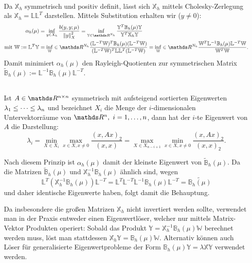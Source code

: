 \\
Da $\mathbb{X}_h$ symmetrisch und positiv definit, lässt sich $\mathbb{X}_h$ mittels Cholesky-Zerlegung als $\mathbb{X}_h = \mathbb{LL}^T$ darstellen.
Mittels Substitution erhalten wir ($y\neq 0$):
\begin{align*}
\alpha_h(\mu) &= \inf\limits_{y\in X_h} \frac{b(y,y;\mu)}{\norm{y}_X^2} =\inf\limits_{\mathbb{Y}\in \R^{N_h}}\frac{\mathbb{Y}^T\mathbb{B}_h(\mu)\mathbb{Y}}{\mathbb{Y}^T\mathbb{X}_h\mathbb{Y}}\\
\text{mit }\mathbb{W}:=\mathbb{L}^T\mathbb{Y} &= \inf\limits_{\mathbb{W}}\in \R^{N_h} \frac{(\mathbb{L}^{-T}\mathbb{W})^T\mathbb{B}_h(\mu)(\mathbb{L}^{-T}\mathbb{W})}{(\mathbb{L}^{-T}\mathbb{W})^T\mathbb{L}\mathbb{L}^T(\mathbb{L}^{-T}\mathbb{W})} = \inf\limits_{\mathbb{W}}\in \R^{N_h} \frac{\mathbb{W}^T\mathbb{L}^{-1}\mathbb{B}_h(\mu)\mathbb{L}^{-T}\mathbb{W}}{\mathbb{W}^T\mathbb{W}}.
\end{align*}
Damit minimiert $\alpha_h(\mu)$ den Rayleigh-Quotienten zur symmetrischen Matrix $\tilde{\mathbb{B}}_h(\mu) := \mathbb{L}^{-1}\mathbb{B}_h(\mu)\mathbb{L}^{-T}.$

\\
Ist $A\in \R^{n\times n}$ symmetrisch mit aufsteigend sortierten Eigenwerten $\lambda_1\le \dots \le\lambda_n$ und bezeichnet $X_i$ die Menge der $i$-dimensionalen Untervektorräume von $\R^n,~i=1\dt{,}n$, dann hat der $i$-te Eigenwert von $A$ die Darstellung:
\[
\lambda_i = \min\limits_{X\in X_i}\max\limits_{x\in X,x\neq 0} \frac{(x,Ax)_2}{(x,x)} = \max\limits_{X\in X_{n-i+1}}\min_{x\in X,x\neq 0} \frac{(x,Ax)_2}{(x,x)_2}. 
\]

Nach diesem Prinzip ist $\alpha_h(\mu)$ damit der kleinste Eigenwert von $\tilde{\mathbb{B}}_h(\mu)$.
Da die Matrizen $\tilde{\mathbb{B}}_h(\mu)$ und $\mathbb{X}_h^{-1}\mathbb{B}_h(\mu)$ ähnlich sind, wegen
\[
\mathbb{L}^T(\mathbb{X}_h^{-1}\mathbb{B}_h(\mu))\mathbb{L}^{-T} = \mathbb{L}^T\mathbb{L}^{-T}\mathbb{L}^{-1}\mathbb{B}_h(\mu)\mathbb{L}^{-T} = \tilde{\mathbb{B}_h(\mu)}
\]
und daher identische Eigenwerte haben, folgt damit die Behauptung.

Da insbesondere die großen Matrizen $\mathbb{X}_h$ nicht invertiert werden sollte, verwendet man in der Praxis entweder einen Eigenwertlöser, welcher nur mittels Matrix-Vektor Produkten operiert:
Sobald das Produkt $\mathbb{Y} = \mathbb{X}_h^{-1}\mathbb{B}_h(\mu)\mathbb{W}$ berechnet werden muss, löst man stattdessen  $\mathbb{X}_h\mathbb{Y} = \mathbb{B}_h(\mu)\mathbb{W}$. 
Alternativ können auch Löser für generalisierte Eigenwertprobleme der Form $\mathbb{B}_h(\mu)\mathbb{Y} = \lambda\mathbb{X}\mathbb{Y}$ verwendet werden.

